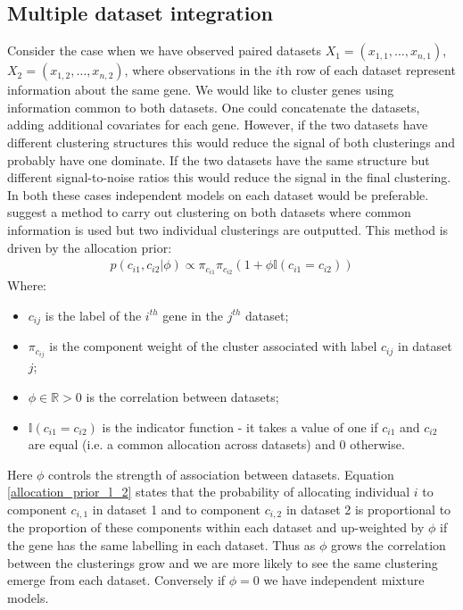 \documentclass[12pt]{article} %
\begin{document}
	\subsection{Multiple dataset integration}
	Consider the case when we have observed paired datasets $X_1 = (x_{1,1},\ldots,x_{n,1})$, $X_2 = (x_{1,2},\ldots,x_{n,2})$, where observations in the $i$th row of each dataset represent information about the same gene. We would like to cluster genes using information common to both datasets. One could concatenate the datasets, adding additional covariates for each gene. However, if the two datasets have different clustering structures this would reduce the signal of both clusterings and probably have one dominate. If the two datasets have the same structure but different signal-to-noise ratios this would reduce the signal in the final clustering. In both these cases independent models on each dataset would be preferable. \citet{KirkBayesiancorrelatedclustering2012} suggest a method to carry out clustering on both datasets where common information is used but two individual clusterings are outputted. This method is driven by the allocation prior:
	\begin{align} \label{allocation_prior_l_2}
	p(c_{i1}, c_{i2} | \phi ) \propto \pi_{c_{i1}} \pi_{c_{i2}} (1 + \phi \mathbb{I}(c_{i1} = c_{i2}))
	\end{align}
	Where:
	\begin{itemize}
		\item $c_{ij}$ is the label of the $i^{th}$ gene in the $j^{th}$ dataset;
		\item $\pi_{c_{ij}}$ is the component weight of the cluster associated with label $c_{ij}$ in dataset $j$;
		\item $\phi \in \mathbb{R} > 0$ is the correlation between datasets;
		\item $\mathbb{I}(c_{i1} = c_{i2})$ is the indicator function - it takes a value of one if $c_{i1}$ and $c_{i2}$ are equal (i.e. a common allocation across datasets) and 0 otherwise.
	\end{itemize}
	Here $\phi$ controls the strength of association between datasets. Equation \eqref{allocation_prior_l_2} states that the probability of allocating individual $i$ to component $c_{i,1}$ in dataset 1 and to component $c_{i,2}$ in dataset 2 is proportional to the proportion of these components within each dataset and up-weighted by $\phi$ if the gene has the same labelling in each dataset. Thus as $\phi$ grows the correlation between the clusterings grow and we are more likely to see the same clustering emerge from each dataset. Conversely if $\phi = 0$ we have independent mixture models. 
	
\end{document}
